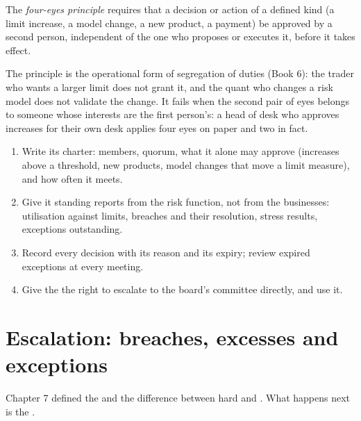 \begin{definition}\label{def:fm:the-risk-management-function:foureyes}
The \emph{four-eyes principle} requires that a decision or action of a defined kind (a limit increase, a model change, a
new product, a payment) be approved by a second person, independent of the one who proposes or executes it, before it takes effect.
\end{definition}

The principle is the operational form of segregation of duties (Book 6): the trader who wants a larger limit does not grant it, and the quant who
changes a risk model does not validate the change. It fails when the second pair of eyes belongs to someone whose interests are the first person's:
a head of desk who approves increases for their own desk applies four eyes on paper and two in fact.

\begin{method}\label{met:fm:the-risk-management-function:committee}
\begin{enumerate}
\item Write its charter: members, quorum, what it alone may approve (increases above a threshold, new products, model changes that move a limit
measure), and how often it meets.
\item Give it standing reports from the risk function, not from the businesses: utilisation against limits, breaches and their resolution, stress
results, exceptions outstanding.
\item Record every decision with its reason and its expiry; review expired exceptions at every meeting.
\item Give the  the right to escalate to the board's committee directly, and use it.
\end{enumerate}
\end{method}

\section{Escalation: breaches, excesses and exceptions}

Chapter 7 defined the  and the difference between hard and . What happens next is the .

